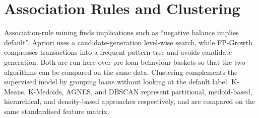 \section{Association Rules and Clustering}
Association-rule mining finds implications such as ``negative balance implies default''. Apriori uses a candidate-generation level-wise search, while FP-Growth compresses transactions into a frequent-pattern tree and avoids candidate generation. Both are run here over pre-loan behaviour baskets so that the two algorithms can be compared on the same data. Clustering complements the supervised model by grouping loans without looking at the default label. K-Means, K-Medoids, AGNES, and DBSCAN represent partitional, medoid-based, hierarchical, and density-based approaches respectively, and are compared on the same standardised feature matrix.

